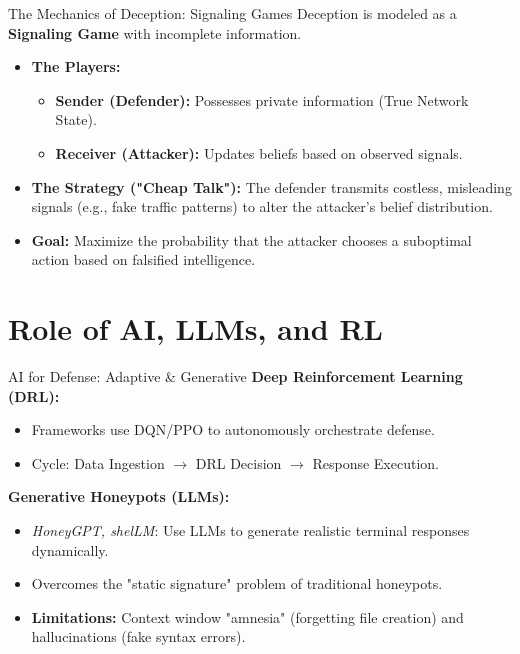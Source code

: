 \documentclass[12pt, aspectratio=169]{beamer}
\begin{document}
\begin{frame}{The Mechanics of Deception: Signaling Games}
    Deception is modeled as a \textbf{Signaling Game} with incomplete information.

    \vspace{0.5cm}
    \begin{itemize}
        \item \textbf{The Players:}
              \begin{itemize}
                  \item \textbf{Sender (Defender):} Possesses private information (True Network State).
                  \item \textbf{Receiver (Attacker):} Updates beliefs based on observed signals.
              \end{itemize}

        \item \textbf{The Strategy ("Cheap Talk"):}
              The defender transmits costless, misleading signals (e.g., fake traffic patterns) to alter the attacker's belief distribution.

        \item \textbf{Goal:} Maximize the probability that the attacker chooses a suboptimal action based on falsified intelligence.
    \end{itemize}
\end{frame}

\section{Role of AI, LLMs, and RL}
\begin{frame}{AI for Defense: Adaptive \& Generative}
    \textbf{Deep Reinforcement Learning (DRL):}
    \begin{itemize}
        \item Frameworks use DQN/PPO to autonomously orchestrate defense.
        \item Cycle: Data Ingestion $\rightarrow$ DRL Decision $\rightarrow$ Response Execution.
    \end{itemize}

    \textbf{Generative Honeypots (LLMs):}
    \begin{itemize}
        \item \textit{HoneyGPT, shelLM}: Use LLMs to generate realistic terminal responses dynamically.
        \item Overcomes the "static signature" problem of traditional honeypots.
        \item \textbf{Limitations:} Context window "amnesia" (forgetting file creation) and hallucinations (fake syntax errors).
    \end{itemize}
\end{frame}
\end{document}
